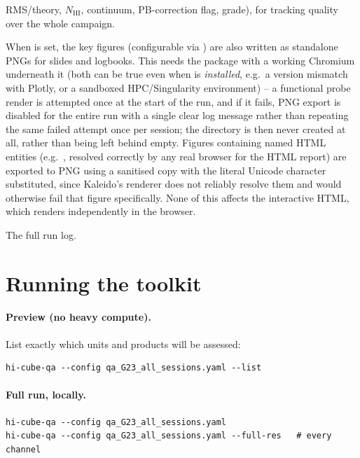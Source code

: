\documentclass[11pt,a4paper]{article}
\begin{document}
\begin{description}[leftmargin=1.6em,style=nextline]
        RMS/theory, $N_{\mathrm{HI}}$, continuum, PB-correction flag, grade), for
        tracking quality over the whole campaign.
  \item[\code{pngs/<obsid>/<pointing>\_<cube>\_<figure>.png}] When
         is set, the key figures (configurable via
        ) are also written as standalone PNGs for
        slides and logbooks. This needs the  package with a
        working Chromium underneath it (both can be true even when
         is \emph{installed}, e.g.\ a version mismatch with
        Plotly, or a sandboxed HPC/Singularity environment) -- a functional
        probe render is attempted once at the start of the run, and if it
        fails, PNG export is disabled for the entire run with a single clear
        log message rather than repeating the same failed attempt once per
        session; the  directory is then never created at all,
        rather than being left behind empty. Figures containing named HTML
        entities (e.g.\ , resolved correctly by any real
        browser for the HTML report) are exported to PNG using a sanitised
        copy with the literal Unicode character substituted, since Kaleido's
        renderer does not reliably resolve them and would otherwise fail that
        figure specifically. None of this affects the interactive HTML, which
        renders independently in the browser.
  \item[\code{hi\_cube\_qa.log}] The full run log.
\end{description}

\section{Running the toolkit}\label{sec:running}
\paragraph{Preview (no heavy compute).} List exactly which units and products
will be assessed:
\begin{lstlisting}
hi-cube-qa --config qa_G23_all_sessions.yaml --list
\end{lstlisting}
\paragraph{Full run, locally.}
\begin{lstlisting}
hi-cube-qa --config qa_G23_all_sessions.yaml
hi-cube-qa --config qa_G23_all_sessions.yaml --full-res   # every channel
\end{lstlisting}
\end{document}
